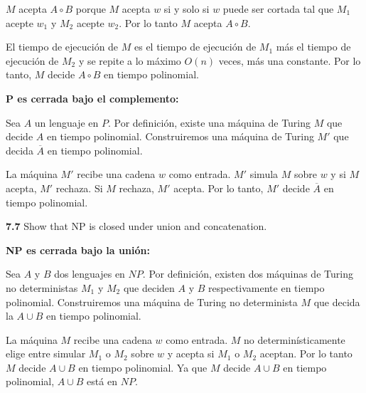 \documentclass{article}
\begin{document}
$M$ acepta $A \circ B$ porque $M$ acepta $w$ si y solo si $w$ puede ser cortada
tal que $M_1$ acepte $w_1$ y $M_2$ acepte $w_2$. Por lo tanto $M$ acepta $A \circ
B$.

El tiempo de ejecución de $M$ es el tiempo de ejecución de $M_1$ más el tiempo
de ejecución de $M_2$ y se repite a lo máximo $O(n)$ veces, más una constante.
Por lo tanto, $M$ decide $A \circ B$ en tiempo polinomial.

\textbf{P es cerrada bajo el complemento:}

Sea $A$ un lenguaje en $P$. Por definición, existe una máquina de Turing $M$ que
decide $A$ en tiempo polinomial. Construiremos una máquina de Turing $M'$ que
decida $\overline{A}$ en tiempo polinomial.

La máquina $M'$ recibe una cadena $w$ como entrada. $M'$ simula $M$ sobre $w$ y
si $M$ acepta, $M'$ rechaza. Si $M$ rechaza, $M'$ acepta. Por lo tanto, $M'$ 
decide $\overline{A}$ en tiempo polinomial.

\textbf{7.7} Show that NP is closed under union and concatenation.

\textbf{NP es cerrada bajo la unión:}

Sea $A$ y $B$ dos lenguajes en $NP$. Por definición, existen dos máquinas de
Turing no deterministas $M_1$ y $M_2$ que deciden $A$ y $B$ respectivamente en
tiempo polinomial. Construiremos una máquina de Turing no determinista $M$ que
decida la $A \cup B$ en tiempo polinomial.

La máquina $M$ recibe una cadena $w$ como entrada. $M$ no determinísticamente
elige entre simular $M_1$ o $M_2$ sobre $w$ y acepta si $M_1$ o $M_2$ aceptan.
Por lo tanto $M$ decide $A \cup B$ en tiempo polinomial. Ya que $M$ decide $A
\cup B$ en tiempo polinomial, $A \cup B$ está en $NP$.
\end{document}
